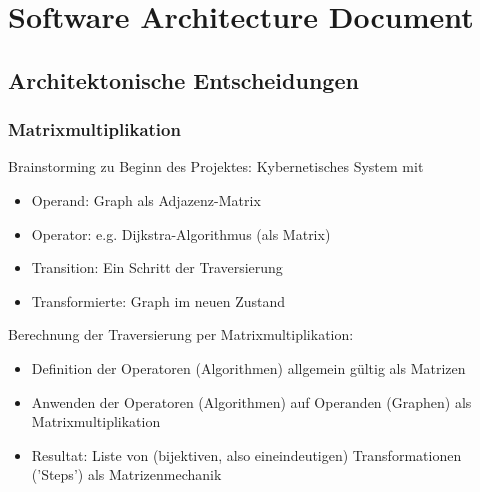 \section{Software Architecture Document}
\label{sec:Software Architecture Document}
% 
% 
% 
% 
% 
\subsection{Architektonische Entscheidungen}
% 
\subsubsection{Matrixmultiplikation}
Brainstorming zu Beginn des Projektes: Kybernetisches System mit
\begin{itemize}
  \item Operand: Graph als Adjazenz-Matrix
  \item Operator: e.g. Dijkstra-Algorithmus (als Matrix)
  \item Transition: Ein Schritt der Traversierung
  \item Transformierte: Graph im neuen Zustand
\end{itemize}
Berechnung der Traversierung per Matrixmultiplikation:
\begin{itemize}
  \item Definition der Operatoren (Algorithmen) allgemein g\"ultig als Matrizen
  \item Anwenden der Operatoren (Algorithmen) auf Operanden (Graphen) als Matrixmultiplikation
  \item Resultat: Liste von (bijektiven, also eineindeutigen) Transformationen ('Steps') als Matrizenmechanik
\end{itemize}
% 

